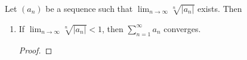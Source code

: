 \documentclass[../main.tex]{subfiles}
\begin{document}
\begin{theorem}\label{trm:16.16}
    Let $(a_n)$ be a sequence such that $\lim_{n\to\infty}\sqrt[n]{|a_n|}$ exists. Then
    \begin{enumerate}[label={\textup{(}\alph*\textup{)}}]
        \item If $\lim_{n\to\infty}\sqrt[n]{|a_n|}<1$, then $\sum_{n=1}^\infty a_n$ converges.
        \begin{proof}


\end{proof}
\end{enumerate}
\end{theorem}
\end{document}
